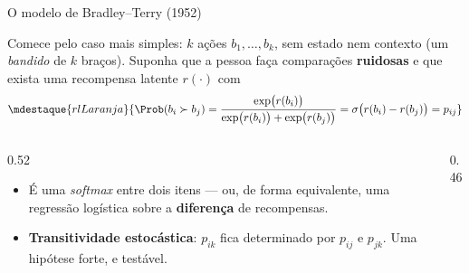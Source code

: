 \documentclass[aspectratio=169, 11pt]{beamer}
\newcommand{\sig}{\sigma}
\begin{document}
\begin{frame}{O modelo de Bradley--Terry (1952)}

  Comece pelo caso mais simples: $k$ ações $b_1,\dots,b_k$, sem estado nem
  contexto (um \emph{bandido} de $k$ braços). Suponha que a pessoa faça
  comparações \textbf{ruidosas} e que exista uma recompensa latente
  $r(\cdot)$ com
  \[
    \mdestaque{rlLaranja}{\Prob(b_i \succ b_j)
      = \frac{\exp\bigl(r(b_i)\bigr)}{\exp\bigl(r(b_i)\bigr) + \exp\bigl(r(b_j)\bigr)}
      = \sig\bigl(r(b_i) - r(b_j)\bigr) = p_{ij}}
  \]

  \begin{columns}[T]
  \begin{column}{0.52\textwidth}
    \begin{itemize}\setlength{\itemsep}{0.2ex}
      \item É uma \emph{softmax} entre dois itens --- ou, de forma equivalente,
        uma regressão logística sobre a \textbf{diferença} de recompensas.
      \item \textbf{Transitividade estocástica}: $p_{ik}$ fica determinado por
        $p_{ij}$ e $p_{jk}$. Uma hipótese forte, e testável.
    \end{itemize}
  \end{column}
  \begin{column}{0.46\textwidth}
    \begin{center}
    \end{center}
  \end{column}
  \end{columns}
\end{frame}
\end{document}
